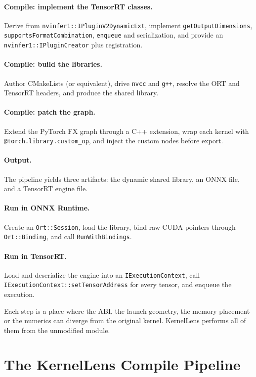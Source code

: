 \documentclass[11pt,a4paper]{article}
\begin{document}
\paragraph{Compile: implement the TensorRT classes.} Derive from
\texttt{nvinfer1::IPluginV2DynamicExt}, implement \texttt{getOutputDimensions},
\texttt{supportsFormatCombination}, \texttt{enqueue} and serialization, and
provide an \texttt{nvinfer1::IPluginCreator} plus registration.

\paragraph{Compile: build the libraries.} Author CMakeLists (or equivalent),
drive \texttt{nvcc} and \texttt{g++}, resolve the ORT and TensorRT headers, and
produce the shared library.

\paragraph{Compile: patch the graph.} Extend the PyTorch FX graph through a C++
extension, wrap each kernel with \texttt{@torch.library.custom\_op}, and inject
the custom nodes before export.

\paragraph{Output.} The pipeline yields three artifacts: the dynamic shared
library, an ONNX file, and a TensorRT engine file.

\paragraph{Run in ONNX Runtime.} Create an \texttt{Ort::Session}, load the
library, bind raw CUDA pointers through \texttt{Ort::Binding}, and call
\texttt{RunWithBindings}.

\paragraph{Run in TensorRT.} Load and deserialize the engine into an
\texttt{IExecutionContext}, call
\texttt{IExecutionContext::setTensorAddress} for every tensor, and enqueue the
execution.

Each step is a place where the ABI, the launch geometry, the memory placement or
the numerics can diverge from the original kernel. KernelLens performs all of
them from the unmodified module.

\section{The KernelLens Compile Pipeline}
\label{sec:compile}
\end{document}
